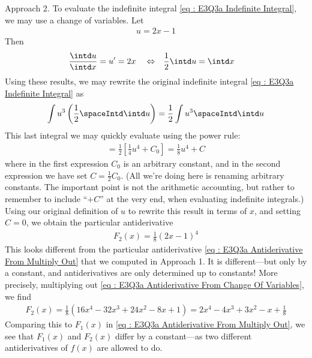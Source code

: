 {Approach 2. To evaluate the indefinite integral \eqref{eq : E3Q3a Indefinite Integral}, we may use a change of variables. Let
\begin{align*}
u
=
2 x - 1
\end{align*}
Then
\begin{align*}
\frac{\intd u}{\intd x}
=
u'
&=
2 x
&
&\Leftrightarrow
&
\frac{1}{2} \intd u
&=
\intd x
\end{align*}
Using these results, we may rewrite the original indefinite integral \eqref{eq : E3Q3a Indefinite Integral} as
\begin{align*}
\int u^{3} \left(\frac{1}{2} \spaceIntd \intd u\right)
=
\frac{1}{2} \int u^{3} \spaceIntd \intd u
\end{align*}
This last integral we may quickly evaluate using the power rule:
\begin{align*}
=
\frac{1}{2} \left[\frac{1}{4} u^{4} + C_{0}\right]
=
\frac{1}{8} u^{4} + C
\end{align*}
where in the first expression $C_{0}$ is an arbitrary constant, and in the second expression we have set $C = \frac{1}{2} C_{0}$. (All we're doing here is renaming arbitrary constants. The important point is not the arithmetic accounting, but rather to remember to include ``$+ C$'' at the very end, when evaluating indefinite integrals.) Using our original definition of $u$ to rewrite this result in terms of $x$, and setting $C = 0$, we obtain the particular antiderivative
\begin{align}
F_{2}(x)
=
\frac{1}{8} (2 x - 1)^{4}%
\label{eq : E3Q3a Antiderivative From Change Of Variables}
\end{align}
This looks different from the particular antiderivative \eqref{eq : E3Q3a Antiderivative From Multiply Out} that we computed in Approach 1. It is different---but only by a constant, and antiderivatives are only determined up to constants! More precisely, multiplying out \eqref{eq : E3Q3a Antiderivative From Change Of Variables}, we find
\begin{align*}
F_{2}(x)
=
\frac{1}{8} \left(16 x^{4} - 32 x^{3} + 24 x^{2} - 8 x + 1\right)
=
2 x^{4} - 4 x^{3} + 3 x^{2} - x + \frac{1}{8}
\end{align*}
Comparing this to $F_{1}(x)$ in \eqref{eq : E3Q3a Antiderivative From Multiply Out}, we see that $F_{1}(x)$ and $F_{2}(x)$ differ by a constant---as two different antiderivatives of $f(x)$ are allowed to do.

}
